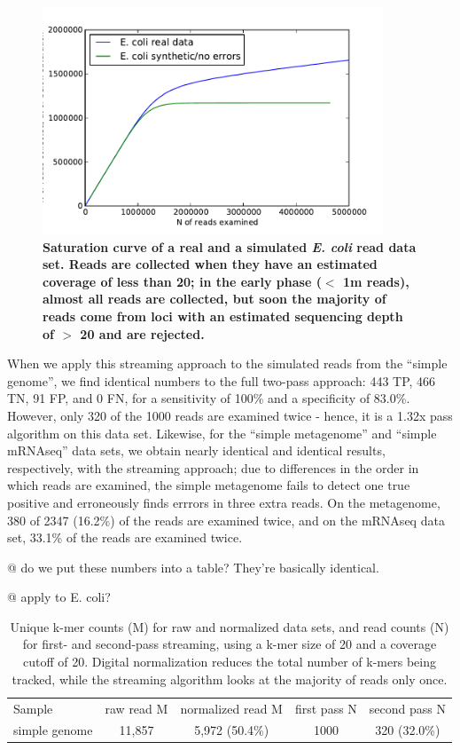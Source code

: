 \documentclass{article}
\begin{document}
\begin{figure}[!ht]
 \centerline{\includegraphics[width=4in]{./figures/saturation}}
\caption{\bf Saturation curve of a real and a simulated {\em E. coli} read data
set.  Reads are collected when they have an estimated coverage of less
than 20; in the early phase ($<$ 1m reads), almost all reads are
collected, but soon the majority of reads come from loci with an estimated
sequencing depth of $>$ 20 and are rejected.}
\label{fig:saturation}
\end{figure}


When we apply this streaming approach to the simulated reads from the
``simple genome'', we find identical numbers to the full two-pass
approach: 443 TP, 466 TN, 91 FP, and 0 FN, for a sensitivity of 100\%
and a specificity of 83.0\%.  However, only 320 of the 1000 reads are
examined twice - hence, it is a 1.32x pass algorithm on this data set.
Likewise, for the ``simple metagenome''
and ``simple mRNAseq'' data sets, we obtain nearly identical and
identical results, respectively, with the streaming approach; due to
differences in the order in which reads are examined, the simple
metagenome fails to detect one true positive and erroneously finds
errrors in three extra reads.  On the metagenome, 380 of 2347 (16.2\%) of
the reads are examined twice, and on the mRNAseq data set, 33.1\% of the
reads are examined twice.

@ do we put these numbers into a table? They're basically identical.

@ apply to E. coli?

\begin{table}
\begin{tabular}{|l|c|c|c|c|}
\hline
Sample & raw read M & normalized read M & first pass N & second pass N \\
simple genome & 11,857 & 5,972 (50.4\%) & 1000 & 320 (32.0\%) \\
\hline
\end{tabular}
\label{tab:streaming_counts}

\caption{Unique k-mer counts (M) for raw and normalized data sets, and
read counts (N) for first- and second-pass streaming, using a k-mer size
of 20 and a coverage cutoff of 20.  Digital normalization reduces the
total number of k-mers being tracked, while the streaming algorithm
looks at the majority of reads only once.}
\end{table}
\end{document}
